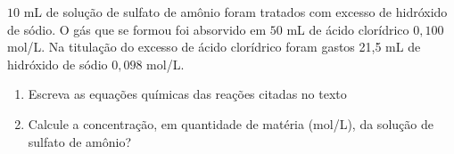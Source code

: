 $10$ mL de solução de sulfato de amônio foram tratados com excesso de hidróxido de sódio.
O gás que se formou foi absorvido em $50$ mL de ácido clorídrico $0,100$ mol/L.
Na titulação do excesso de ácido clorídrico foram gastos 21,5 mL de hidróxido de sódio $0,098$ mol/L.

\begin{enumerate}[label = (\alph*)]
	\item Escreva as equações químicas das reações citadas no texto
	\item Calcule a concentração, em quantidade de matéria (mol/L), da solução de sulfato de amônio?
\end{enumerate}

